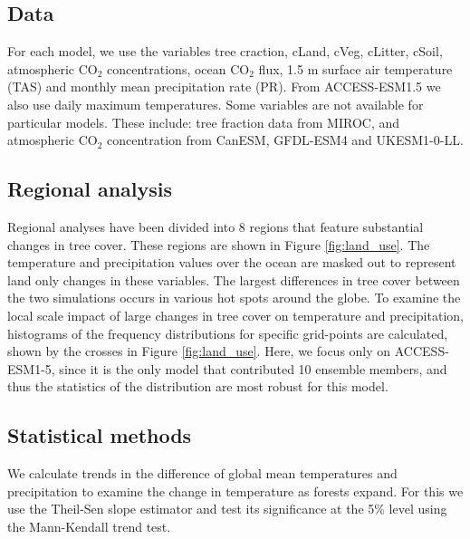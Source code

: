 \documentclass[]{article}
\begin{document}
\subsection{Data}

For each model, we use the variables tree craction, cLand, cVeg, cLitter, cSoil, atmospheric CO$_2$ concentrations, ocean CO$_2$ flux, 1.5 m surface air temperature (TAS) and monthly mean precipitation rate (PR).
From ACCESS-ESM1.5 we also use daily maximum temperatures.
Some variables are not available for particular models. These include: tree fraction data from MIROC, and atmospheric CO$_2$ concentration from CanESM, GFDL-ESM4 and UKESM1-0-LL.

\subsection{Regional analysis}

Regional analyses have been divided into 8 regions that feature substantial changes in tree cover.
These regions are shown in Figure \ref{fig:land_use}.
The temperature and precipitation values over the ocean are masked out to represent land only changes in these variables.
The largest differences in tree cover between the two simulations occurs in various hot spots around the globe.
To examine the local scale impact of large changes in tree cover on temperature and precipitation, histograms of the frequency distributions for specific grid-points are calculated, shown by the crosses in Figure \ref{fig:land_use}.
Here, we focus only on ACCESS-ESM1-5, since it is the only model that contributed 10 ensemble members, and thus the statistics of the distribution are most robust for this model.


\subsection{Statistical methods}

We calculate trends in the difference of global mean temperatures and precipitation to examine the change in temperature as forests expand.
For this we use the Theil-Sen slope estimator and test its significance at the 5\% level using the Mann-Kendall trend test.
\end{document}
